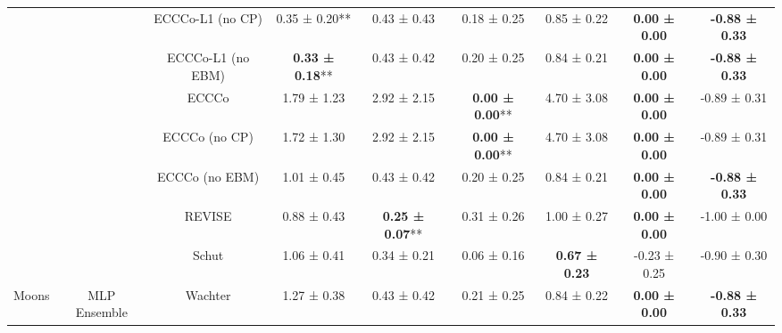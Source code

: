 \begin{longtable}[t]{ccccccccc}
 &  & ECCCo-L1 (no CP) & 0.35 ± 0.20** & 0.43 ± 0.43\hphantom{*}\hphantom{*} & 0.18 ± 0.25\hphantom{*}\hphantom{*} & 0.85 ± 0.22\hphantom{*}\hphantom{*} & \textbf{0.00 ± 0.00}\hphantom{*}\hphantom{*} & \textbf{-0.88 ± 0.33}\hphantom{*}\hphantom{*}\\

 &  & ECCCo-L1 (no EBM) & \textbf{0.33 ± 0.18}** & 0.43 ± 0.42\hphantom{*}\hphantom{*} & 0.20 ± 0.25\hphantom{*}\hphantom{*} & 0.84 ± 0.21\hphantom{*}\hphantom{*} & \textbf{0.00 ± 0.00}\hphantom{*}\hphantom{*} & \textbf{-0.88 ± 0.33}\hphantom{*}\hphantom{*}\\

 &  & ECCCo & 1.79 ± 1.23\hphantom{*}\hphantom{*} & 2.92 ± 2.15\hphantom{*}\hphantom{*} & \textbf{0.00 ± 0.00}** & 4.70 ± 3.08\hphantom{*}\hphantom{*} & \textbf{0.00 ± 0.00}\hphantom{*}\hphantom{*} & -0.89 ± 0.31\hphantom{*}\hphantom{*}\\

 &  & ECCCo (no CP) & 1.72 ± 1.30\hphantom{*}\hphantom{*} & 2.92 ± 2.15\hphantom{*}\hphantom{*} & \textbf{0.00 ± 0.00}** & 4.70 ± 3.08\hphantom{*}\hphantom{*} & \textbf{0.00 ± 0.00}\hphantom{*}\hphantom{*} & -0.89 ± 0.31\hphantom{*}\hphantom{*}\\

 &  & ECCCo (no EBM) & 1.01 ± 0.45\hphantom{*}\hphantom{*} & 0.43 ± 0.42\hphantom{*}\hphantom{*} & 0.20 ± 0.25\hphantom{*}\hphantom{*} & 0.84 ± 0.21\hphantom{*}\hphantom{*} & \textbf{0.00 ± 0.00}\hphantom{*}\hphantom{*} & \textbf{-0.88 ± 0.33}\hphantom{*}\hphantom{*}\\

 &  & REVISE & 0.88 ± 0.43\hphantom{*}\hphantom{*} & \textbf{0.25 ± 0.07}** & 0.31 ± 0.26\hphantom{*}\hphantom{*} & 1.00 ± 0.27\hphantom{*}\hphantom{*} & \textbf{0.00 ± 0.00}\hphantom{*}\hphantom{*} & -1.00 ± 0.00\hphantom{*}\hphantom{*}\\

 &  & Schut & 1.06 ± 0.41\hphantom{*}\hphantom{*} & 0.34 ± 0.21\hphantom{*}\hphantom{*} & 0.06 ± 0.16\hphantom{*}\hphantom{*} & \textbf{0.67 ± 0.23}\hphantom{*}\hphantom{*} & -0.23 ± 0.25\hphantom{*}\hphantom{*} & -0.90 ± 0.30\hphantom{*}\hphantom{*}\\

\multirow[t]{-36}{*}{\centering\arraybackslash Moons} & \multirow[t]{-9}{*}{\centering\arraybackslash MLP Ensemble} & Wachter & 1.27 ± 0.38\hphantom{*}\hphantom{*} & 0.43 ± 0.42\hphantom{*}\hphantom{*} & 0.21 ± 0.25\hphantom{*}\hphantom{*} & 0.84 ± 0.22\hphantom{*}\hphantom{*} & \textbf{0.00 ± 0.00}\hphantom{*}\hphantom{*} & \textbf{-0.88 ± 0.33}\hphantom{*}\hphantom{*}\\*
\end{longtable}
